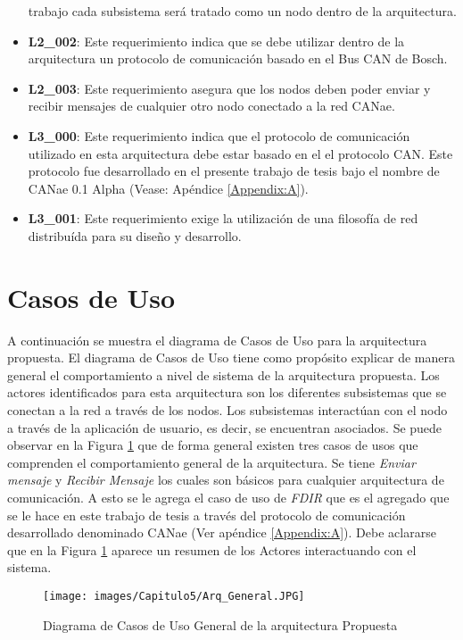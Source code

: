 \begin{itemize}
  trabajo cada subsistema será tratado como un nodo dentro de la arquitectura.
\item\textbf{L2\_002}: Este requerimiento indica que se debe utilizar dentro de
  la arquitectura un protocolo de comunicación basado en el Bus CAN de Bosch.
\item\textbf{L2\_003}: Este requerimiento asegura que los nodos deben poder enviar
  y recibir mensajes de cualquier otro nodo conectado a la red CANae.
\item\textbf{L3\_000}: Este requerimiento indica que el protocolo de
  comunicación utilizado en esta arquitectura debe estar basado en el
  el protocolo CAN. Este protocolo fue desarrollado en el presente
  trabajo de tesis bajo el nombre de CANae 0.1 Alpha (Vease: Apéndice \ref{Appendix:A}).
\item\textbf{L3\_001}: Este requerimiento exige la utilización de una
  filosofía de red distribuída para su diseño y desarrollo.
\end{itemize}

\section{Casos de Uso}\label{sec:caso_uso}
A continuación se muestra el diagrama de Casos de Uso para la arquitectura propuesta.
El diagrama de Casos de Uso tiene como propósito explicar de manera general
el comportamiento a nivel de sistema de la arquitectura propuesta.
Los actores identificados para esta arquitectura son los diferentes
subsistemas que se conectan a la red a través de los nodos.
Los subsistemas interactúan con el nodo a través de
la aplicación de usuario, es decir, se encuentran asociados.
Se puede observar en la Figura \ref{fig:DiagramaCUArqPropuestaGENERAL}
que de forma general existen tres casos de usos que comprenden el comportamiento
general de la arquitectura. Se tiene \textit{Enviar mensaje} y \textit{Recibir
  Mensaje} los cuales son básicos para cualquier arquitectura de comunicación. A
esto se le agrega el caso de uso de \textit{FDIR} que es el agregado que se le
hace en este trabajo de tesis a través del protocolo de comunicación desarrollado
denominado CANae (Ver apéndice \ref{Appendix:A}). Debe aclararse que en 
la Figura \ref{fig:DiagramaCUArqPropuestaGENERAL}
aparece un resumen de los Actores interactuando con el sistema. 

\begin{figure}[h!]
 \centering
 \texttt{[image: images/Capitulo5/Arq\_General.JPG]}
  \caption{Diagrama de Casos de Uso General de la arquitectura Propuesta}
\label{fig:DiagramaCUArqPropuestaGENERAL}
\end{figure} 

